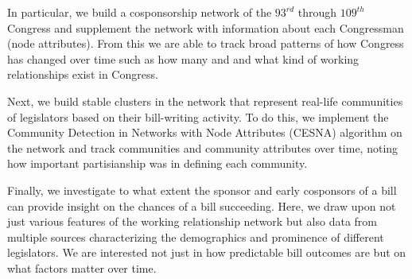 In particular, we build a cosponsorship network of the $93^{rd}$ through
$109^{th}$ Congress and supplement the network with information about each
Congressman (node attributes). From this we are able to track broad patterns of
how Congress has changed over time such as how many and and what kind of working
relationships exist in Congress.

Next, we build stable clusters in the network that represent real-life
communities of legislators based on their bill-writing activity. To do this, we
implement the Community Detection in Networks with Node Attributes (CESNA)
algorithm on the network and track communities and community attributes over
time, noting how important partisianship was in defining each community.

Finally, we investigate to what extent the sponsor and early cosponsors of a
bill can provide insight on the chances of a bill succeeding. Here, we draw upon
not just various features of the working relationship network but also data from
multiple sources characterizing the demographics and prominence of different
legislators. We are interested not just in how predictable bill outcomes are but
on what factors matter over time.
